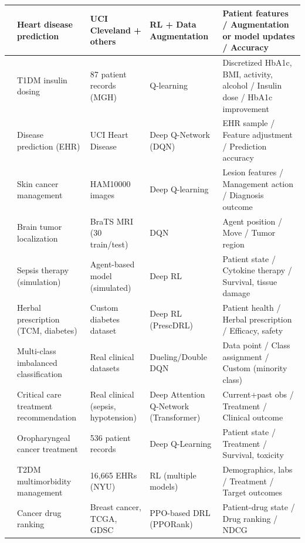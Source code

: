 \begin{longtable}{|p{1cm}|p{2.5cm}|p{2.5cm}|p{2.5cm}|p{3cm}|}
\scriptsize
\cite{gayathriEnhancingHeartDisease2024} & Heart disease prediction & UCI Cleveland + others & RL + Data Augmentation & Patient features / Augmentation or model updates / Accuracy \\
\hline
\cite{javadReinforcementLearningBased2019} & T1DM insulin dosing & 87 patient records (MGH) & Q-learning & Discretized HbA1c, BMI, activity, alcohol / Insulin dose / HbA1c improvement \\
\hline
\cite{abdelazizDeepQNetworkDQN2025} & Disease prediction (EHR) & UCI Heart Disease & Deep Q-Network (DQN) & EHR sample / Feature adjustment / Prediction accuracy \\
\hline
\cite{barataReinforcementLearningModel2023} & Skin cancer management & HAM10000 images & Deep Q-learning & Lesion features / Management action / Diagnosis outcome \\
\hline
\cite{stemberReinforcementLearningUsing2022} & Brain tumor localization & BraTS MRI (30 train/test) & DQN & Agent position / Move / Tumor region \\
\hline
\cite{petersenDeepReinforcementLearning2019} & Sepsis therapy (simulation) & Agent-based model (simulated) & Deep RL & Patient state / Cytokine therapy / Survival, tissue damage \\
\hline
\cite{yangPrescDRLDeepReinforcement2024} & Herbal prescription (TCM, diabetes) & Custom diabetes dataset & Deep RL (PrescDRL) & Patient health / Herbal prescription / Efficacy, safety \\
\hline
\cite{yangDeepReinforcementLearning2024} & Multi-class imbalanced classification & Real clinical datasets & Dueling/Double DQN & Data point / Class assignment / Custom (minority class) \\
\hline
\cite{maDeepAttentionQnetwork2023} & Critical care treatment recommendation & Real clinical (sepsis, hypotension) & Deep Attention Q-Network (Transformer) & Current+past obs / Treatment / Clinical outcome \\
\hline
\cite{tardiniOptimalTreatmentSelection2022} & Oropharyngeal cancer treatment & 536 patient records & Deep Q-Learning & Patient state / Treatment / Survival, toxicity \\
\hline
\cite{zhengPersonalizedMultimorbidityManagement2021} & T2DM multimorbidity management & 16,665 EHRs (NYU) & RL (multiple models) & Demographics, labs / Treatment / Target outcomes \\
\hline
\cite{liuDeepReinforcementLearning2022} & Cancer drug ranking & Breast cancer, TCGA, GDSC & PPO-based DRL (PPORank) & Patient-drug state / Drug ranking / NDCG  \\

\end{longtable}
